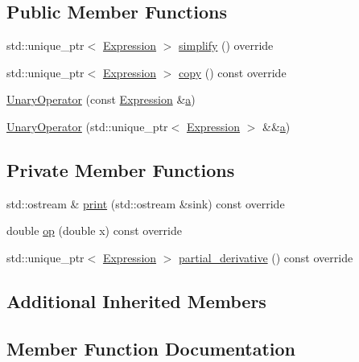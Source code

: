 \subsection*{Public Member Functions}
\begin{DoxyCompactItemize}
\item 
std\+::unique\+\_\+ptr$<$ \mbox{\hyperlink{classsymcpp_1_1Expression}{Expression}} $>$ \mbox{\hyperlink{classsymcpp_1_1Cosine_a8bedd5e4ad3245d5ee6e6e7da3b5e8dc}{simplify}} () override
\item 
std\+::unique\+\_\+ptr$<$ \mbox{\hyperlink{classsymcpp_1_1Expression}{Expression}} $>$ \mbox{\hyperlink{classsymcpp_1_1Cosine_a63c4510666729dfcf5727299945c60f5}{copy}} () const override
\item 
\mbox{\hyperlink{classsymcpp_1_1Cosine_a23a8172db96675ebf1114f4f3f41b6f1}{Unary\+Operator}} (const \mbox{\hyperlink{classsymcpp_1_1Expression}{Expression}} \&\mbox{\hyperlink{classsymcpp_1_1UnaryOperator_a1558842963261562d2ef68e324822cba}{a}})
\item 
\mbox{\hyperlink{classsymcpp_1_1Cosine_ad3aa899567a080eeb41cb850de310178}{Unary\+Operator}} (std\+::unique\+\_\+ptr$<$ \mbox{\hyperlink{classsymcpp_1_1Expression}{Expression}} $>$ \&\&\mbox{\hyperlink{classsymcpp_1_1UnaryOperator_a1558842963261562d2ef68e324822cba}{a}})
\end{DoxyCompactItemize}
\subsection*{Private Member Functions}
\begin{DoxyCompactItemize}
\item 
std\+::ostream \& \mbox{\hyperlink{classsymcpp_1_1Cosine_a2d8d4dc8d5119d59365f212b7d855a53}{print}} (std\+::ostream \&sink) const override
\item 
double \mbox{\hyperlink{classsymcpp_1_1Cosine_a0b476eebbffe0a2914a02bf6d14b05cd}{op}} (double x) const override
\item 
std\+::unique\+\_\+ptr$<$ \mbox{\hyperlink{classsymcpp_1_1Expression}{Expression}} $>$ \mbox{\hyperlink{classsymcpp_1_1Cosine_a92a24c87300b0e400f286b6ecc4eb1dd}{partial\+\_\+derivative}} () const override
\end{DoxyCompactItemize}
\subsection*{Additional Inherited Members}


\subsection{Member Function Documentation}
\mbox{\label{classsymcpp_1_1Cosine_a63c4510666729dfcf5727299945c60f5}} 

